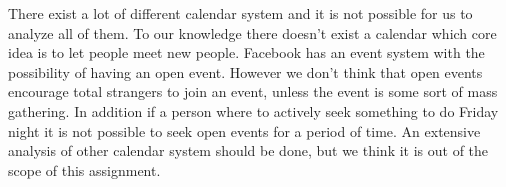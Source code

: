 There exist a lot of different calendar system and it is not possible for us to analyze all of them.
To our knowledge there doesn't exist a calendar which core idea is to let people meet new people. 
Facebook has an event system with the possibility of having an open event. However we don't think that open events encourage total strangers to join an event, unless the event is some sort of mass gathering. 
In addition if a person where to actively seek something to do Friday night it is not possible to seek open events for a period of time. 
An extensive analysis of other calendar system should be done, but we think it is out of the scope of this assignment.
